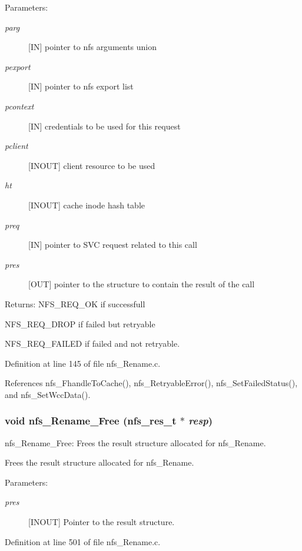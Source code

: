 \begin{Desc}
\item[Parameters:]
\begin{description}
\item[{\em parg}][IN] pointer to nfs arguments union \item[{\em pexport}][IN] pointer to nfs export list \item[{\em pcontext}][IN] credentials to be used for this request \item[{\em pclient}][INOUT] client resource to be used \item[{\em ht}][INOUT] cache inode hash table \item[{\em preq}][IN] pointer to SVC request related to this call \item[{\em pres}][OUT] pointer to the structure to contain the result of the call\end{description}
\end{Desc}
\begin{Desc}
\item[Returns:]NFS\_\-REQ\_\-OK if successfull \par
 NFS\_\-REQ\_\-DROP if failed but retryable \par
 NFS\_\-REQ\_\-FAILED if failed and not retryable. \end{Desc}


Definition at line 145 of file nfs\_\-Rename.c.

References nfs\_\-Fhandle\-To\-Cache(), nfs\_\-Retryable\-Error(), nfs\_\-Set\-Failed\-Status(), and nfs\_\-Set\-Wcc\-Data().
\subsubsection{\setlength{\rightskip}{0pt plus 5cm}void nfs\_\-Rename\_\-Free (nfs\_\-res\_\-t $\ast$ {\em resp})}\label{nfs__Rename_8c_a1}


nfs\_\-Rename\_\-Free: Frees the result structure allocated for nfs\_\-Rename.

Frees the result structure allocated for nfs\_\-Rename.

\begin{Desc}
\item[Parameters:]
\begin{description}
\item[{\em pres}][INOUT] Pointer to the result structure. \end{description}
\end{Desc}


Definition at line 501 of file nfs\_\-Rename.c.